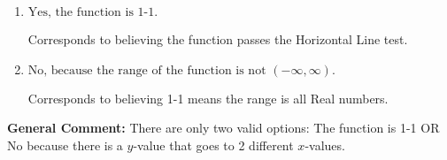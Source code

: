 \documentclass{extbook}[14pt]
\begin{document}
\begin{enumerate}
{\begin{enumerate}[label=\Alph*.]
Corresponds to the Vertical Line test, which checks if an expression is a function.
\item \( \text{Yes, the function is 1-1.} \)

Corresponds to believing the function passes the Horizontal Line test.
\item \( \text{No, because the range of the function is not $(-\infty, \infty)$.} \)

Corresponds to believing 1-1 means the range is all Real numbers.
\end{enumerate}

\textbf{General Comment:} There are only two valid options: The function is 1-1 OR No because there is a $y$-value that goes to 2 different $x$-values.
}
\end{enumerate}
\end{document}
